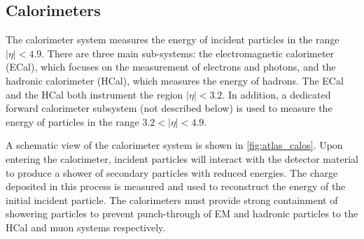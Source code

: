 \subsection{Calorimeters}\label{sec:atlas_calorimeter}

The calorimeter system measures the energy of incident particles in the range $|\eta| < 4.9$.
There are three main sub-systems: the electromagnetic calorimeter (ECal), which focuses on the measurement of electrons and photons, and the hadronic calorimeter (HCal), which measures the energy of hadrons.
The ECal and the HCal both instrument the region $|\eta|< 3.2$.
In addition, a dedicated forward calorimeter subsystem (not described below) is used to measure the energy of particles in the range $3.2 < |\eta| < 4.9$.

A schematic view of the calorimeter system is shown in \cref{fig:atlas_calos}.
Upon entering the calorimeter, incident particles will interact with the detector material to produce a shower of secondary particles with reduced energies. 
The charge deposited in this process is measured and used to reconstruct the energy of the initial incident particle.
The calorimeters must provide strong containment of showering particles to prevent punch-through of EM and hadronic particles to the HCal and muon systems respectively.





